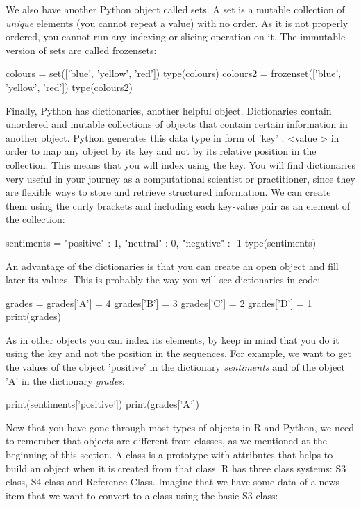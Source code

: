We also have another Python object called sets. A set is a mutable collection of \emph{unique} elements (you cannot repeat a value) with no order. As it is not properly ordered, you cannot run any indexing or slicing operation on it. The immutable version of sets are called frozensets:

\begin{examplepy}
colours = set(['blue', 'yellow', 'red'])
type(colours)
colours2 = frozenset(['blue', 'yellow', 'red'])
type(colours2)
\end{examplepy}

Finally, Python has dictionaries, another helpful object.	 Dictionaries contain unordered and mutable collections of objects that contain certain information in another object. Python generates this data type in form of { 'key' : \textless value \textgreater} in order to map any object by its key and not by its relative position in the collection. This means that you will index using the key. You will find dictionaries very useful in your journey as a computational scientist or practitioner, since they are flexible ways to store and retrieve structured information. We can create them using the curly brackets {} and including each key-value pair as an element of the collection:

\begin{examplepy}
sentiments = {"positive" : 1, "neutral" : 0, "negative" : -1}
type(sentiments)
\end{examplepy}

An advantage of the dictionaries is that you can create an open object and fill later its values. This is probably the way you will see dictionaries in code:

\begin{examplepy}
grades =  {}
grades['A'] = 4
grades['B'] = 3
grades['C'] = 2
grades['D'] = 1
print(grades)
\end{examplepy}

As in other objects you can index its elements, by keep in mind that you do it using the key and not the position in the sequences. For example, we want to get the values of the object 'positive' in the dictionary \emph{sentiments} and of the object 'A' in the dictionary \emph{grades}:

\begin{examplepy}
print(sentiments['positive'])
print(grades['A'])
\end{examplepy}

Now that you have gone through most types of objects in R and Python, we need to remember that objects are different from classes, as we mentioned at the beginning of this section. A class is a prototype with attributes that helps to build an object when it is created from that class. R has three class systems: S3 class, S4 class and Reference Class.  Imagine that we have some data of a news item that we want to convert to a class using the basic S3 class:


